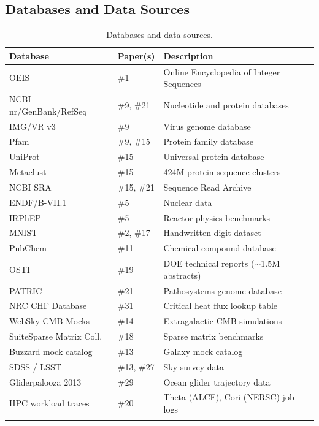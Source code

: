 \documentclass[11pt,letterpaper]{article}
\begin{document}
\subsection{Databases and Data Sources}

\begin{longtable}{l l p{6.5cm}}
\toprule
\textbf{Database} & \textbf{Paper(s)} & \textbf{Description} \\
\midrule
OEIS                     & \#1  & Online Encyclopedia of Integer Sequences \\
NCBI nr/GenBank/RefSeq   & \#9, \#21 & Nucleotide and protein databases \\
IMG/VR v3                & \#9  & Virus genome database \\
Pfam                     & \#9, \#15  & Protein family database \\
UniProt                  & \#15 & Universal protein database \\
Metaclust                & \#15 & 424M protein sequence clusters \\
NCBI SRA                 & \#15, \#21 & Sequence Read Archive \\
ENDF/B-VII.1             & \#5  & Nuclear data \\
IRPhEP                   & \#5  & Reactor physics benchmarks \\
MNIST                    & \#2, \#17  & Handwritten digit dataset \\
PubChem                  & \#11 & Chemical compound database \\
OSTI                     & \#19 & DOE technical reports ($\sim$1.5M abstracts) \\
PATRIC                   & \#21 & Pathosystems genome database \\
NRC CHF Database         & \#31 & Critical heat flux lookup table \\
WebSky CMB Mocks         & \#14 & Extragalactic CMB simulations \\
SuiteSparse Matrix Coll. & \#18 & Sparse matrix benchmarks \\
Buzzard mock catalog      & \#13 & Galaxy mock catalog \\
SDSS / LSST              & \#13, \#27 & Sky survey data \\
Gliderpalooza 2013       & \#29 & Ocean glider trajectory data \\
HPC workload traces      & \#20 & Theta (ALCF), Cori (NERSC) job logs \\
\bottomrule
\caption{Databases and data sources.}
\end{longtable}
\end{document}
